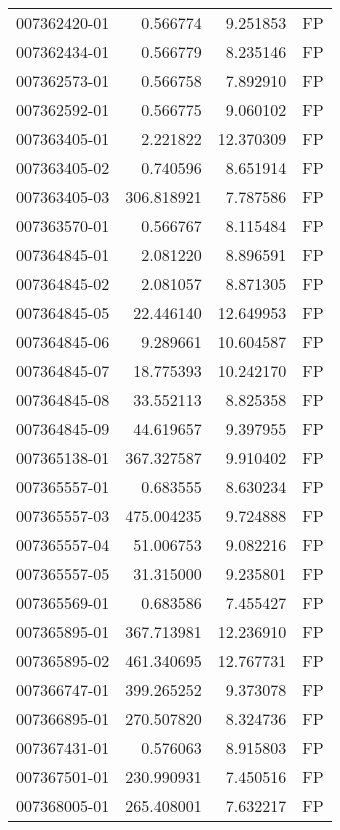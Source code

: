 \begin{tabular}{lrrl}
007362420-01 &    0.566774 &       9.251853 &   FP \\
007362434-01 &    0.566779 &       8.235146 &   FP \\
007362573-01 &    0.566758 &       7.892910 &   FP \\
007362592-01 &    0.566775 &       9.060102 &   FP \\
007363405-01 &    2.221822 &      12.370309 &   FP \\
007363405-02 &    0.740596 &       8.651914 &   FP \\
007363405-03 &  306.818921 &       7.787586 &   FP \\
007363570-01 &    0.566767 &       8.115484 &   FP \\
007364845-01 &    2.081220 &       8.896591 &   FP \\
007364845-02 &    2.081057 &       8.871305 &   FP \\
007364845-05 &   22.446140 &      12.649953 &   FP \\
007364845-06 &    9.289661 &      10.604587 &   FP \\
007364845-07 &   18.775393 &      10.242170 &   FP \\
007364845-08 &   33.552113 &       8.825358 &   FP \\
007364845-09 &   44.619657 &       9.397955 &   FP \\
007365138-01 &  367.327587 &       9.910402 &   FP \\
007365557-01 &    0.683555 &       8.630234 &   FP \\
007365557-03 &  475.004235 &       9.724888 &   FP \\
007365557-04 &   51.006753 &       9.082216 &   FP \\
007365557-05 &   31.315000 &       9.235801 &   FP \\
007365569-01 &    0.683586 &       7.455427 &   FP \\
007365895-01 &  367.713981 &      12.236910 &   FP \\
007365895-02 &  461.340695 &      12.767731 &   FP \\
007366747-01 &  399.265252 &       9.373078 &   FP \\
007366895-01 &  270.507820 &       8.324736 &   FP \\
007367431-01 &    0.576063 &       8.915803 &   FP \\
007367501-01 &  230.990931 &       7.450516 &   FP \\
007368005-01 &  265.408001 &       7.632217 &   FP \\

\end{tabular}

